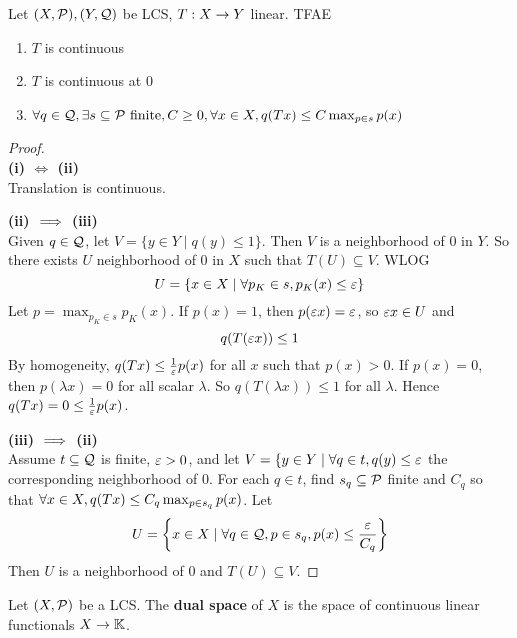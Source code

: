 \documentclass{article}
\begin{document}
\begin{nlemma}\label{lem:lcs-continuity}
  Let $(X, \mathcal P), (Y, \mathcal Q)$ be LCS, $T : X \rightarrow Y$ linear. TFAE
  \begin{enumerate}
    \item $T$ is continuous
    \item $T$ is continuous at $0$
    \item $\forall q \in \mathcal Q, \exists s \subseteq \mathcal P \text{ finite}, C \ge 0, \forall x \in X, q(Tx) \le C\max_{p \in s} p(x)$
  \end{enumerate}
\end{nlemma}
\begin{proof}~\\
  {\bf (i) $\iff$ (ii)} \\
  Translation is continuous.

  {\bf (ii) $\implies$ (iii)} \\
  Given $q \in \mathcal Q$, let $V = \{y \in Y \mid q(y) \le 1\}$. Then $V$ is a neighborhood of $0$ in $Y$. So there exists $U$ neighborhood of $0$ in $X$ such that $T(U) \subseteq V$. WLOG
  $$U = \{x \in X \mid \forall p_K \in s, p_K(x) \le \varepsilon\}$$
  Let $p = \max_{p_K \in s} p_K(x)$. If $p(x) = 1$, then $p(\varepsilon x) = \varepsilon$, so $\varepsilon x \in U$ and
  $$q(T(\varepsilon x)) \le 1$$
  By homogeneity, $q(Tx) \le \frac 1{\varepsilon} p(x)$ for all $x$ such that $p(x) > 0$. If $p(x) = 0$, then $p(\lambda x) = 0$ for all scalar $\lambda$. So $q(T(\lambda x)) \le 1$ for all $\lambda$. Hence $q(Tx) = 0 \le \frac 1{\varepsilon} p(x)$.

  {\bf (iii) $\implies$ (ii)} \\
  Assume $t \subseteq \mathcal Q$ is finite, $\varepsilon > 0$, and let $V = \{y \in Y \mid \forall q \in t, q(y) \le \varepsilon$ the corresponding neighborhood of $0$. For each $q \in t$, find $s_q \subseteq \mathcal P$ finite and $C_q$ so that $\forall x \in X, q(Tx) \le C_q\max_{p \in s_q}p(x)$. Let
  $$U = \left\{x \in X \mid \forall q \in \mathcal Q, p \in s_q, p(x) \le \frac{\varepsilon}{C_q}\right\}$$
  Then $U$ is a neighborhood of $0$ and $T(U) \subseteq V$.
\end{proof}

\begin{defi}
  Let $(X, \mathcal P)$ be a LCS. The {\bf dual space} of $X$ is the space of continuous linear functionals $X \rightarrow \mathbb K$.
\end{defi}

\newlec
\end{document}

